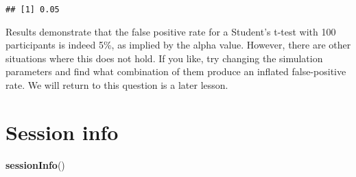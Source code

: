 \documentclass[
]{article}
\newenvironment{Shaded}{\begin{snugshade}}{\end{snugshade}}
\newcommand{\FunctionTok}[1]{\textcolor[rgb]{0.13,0.29,0.53}{\textbf{#1}}}
\newcommand{\NormalTok}[1]{#1}
\begin{document}
\begin{verbatim}
## [1] 0.05
\end{verbatim}

Results demonstrate that the false positive rate for a Student's t-test
with 100 participants is indeed 5\%, as implied by the alpha value.
However, there are other situations where this does not hold. If you
like, try changing the simulation parameters and find what combination
of them produce an inflated false-positive rate. We will return to this
question is a later lesson.

\hypertarget{session-info}{%
\section{Session info}\label{session-info}}

\begin{Shaded}
\begin{Highlighting}[]
\FunctionTok{sessionInfo}\NormalTok{()}
\end{Highlighting}
\end{Shaded}
\end{document}
